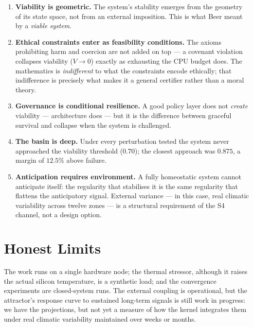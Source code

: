 \documentclass[11pt, a4paper]{article}
\begin{document}
\begin{enumerate}
  \item \textbf{Viability is geometric.} The system's stability emerges from the
        geometry of its state space, not from an external imposition. This is what
        Beer meant by a \emph{viable system}.

  \item \textbf{Ethical constraints enter as feasibility conditions.} The axioms
        prohibiting harm and coercion are not added on top --- a covenant violation
        collapses viability ($V \to 0$) exactly as exhausting the CPU budget does.
        The mathematics is \emph{indifferent} to what the constraints encode
        ethically; that indifference is precisely what makes it a general certifier
        rather than a moral theory.

  \item \textbf{Governance is conditional resilience.} A good policy layer does not
        \emph{create} viability --- architecture does --- but it is the difference
        between graceful survival and collapse when the system is challenged.

  \item \textbf{The basin is deep.} Under every perturbation tested the system never
        approached the viability threshold ($0{.}70$); the closest approach was
        $0{.}875$, a margin of $12{.}5\%$ above failure.

  \item \textbf{Anticipation requires environment.} A fully homeostatic system cannot
        anticipate itself: the regularity that stabilises it is the same regularity
        that flattens the anticipatory signal. External variance --- in this case,
        real climatic variability across twelve zones --- is a structural requirement
        of the S4 channel, not a design option.
\end{enumerate}

\section*{Honest Limits}

The work runs on a single hardware node; the thermal stressor, although it raises the
actual silicon temperature, is a synthetic load; and the convergence experiments are
closed-system runs. The external coupling is operational, but the attractor's response
curve to sustained long-term signals is still work in progress: we have the
projections, but not yet a measure of how the kernel integrates them under real
climatic variability maintained over weeks or months.
\end{document}

